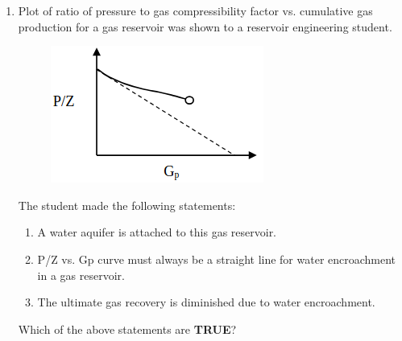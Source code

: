 \documentclass[journal,12pt,onecolumn]{IEEEtran}
\theoremstyle{remark}
\begin{document}
\begin{enumerate}
\begin{enumerate}
\end{enumerate}

\item Plot of ratio of pressure to gas compressibility factor  vs. cumulative gas production
 for a gas reservoir  was shown to a reservoir
engineering student.

\hfill{}

\begin{figure}[h!]
  \centering
  \includegraphics[width=0.4\columnwidth]{figs/pic4.png} 
   \caption*{}
  \label{fig:Q18}
\end{figure}

\noindent
The student made the following statements:

\begin{enumerate}
\item A water aquifer is attached to this gas reservoir.
\item P/Z vs. Gp curve must always be a straight line for water encroachment in a gas reservoir.
\item The ultimate gas recovery is diminished due to water encroachment.
\end{enumerate}

Which of the above statements are \textbf{TRUE}?


\begin{enumerate}
\end{enumerate}


\end{enumerate}
\end{document}
